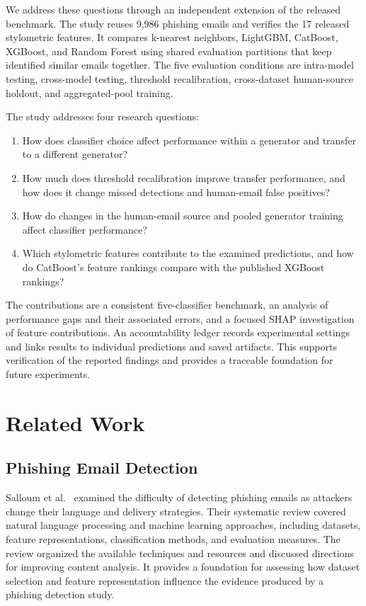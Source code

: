 \documentclass[conference]{IEEEtran}
\begin{document}
We address these questions through an independent extension of the
released benchmark. The study reuses 9,986 phishing emails and
verifies the 17 released stylometric features. It compares
k-nearest neighbors, LightGBM, CatBoost, XGBoost, and Random
Forest using shared evaluation partitions that keep identified
similar emails together. The five evaluation conditions are
intra-model testing, cross-model testing, threshold recalibration,
cross-dataset human-source holdout, and aggregated-pool training.

The study addresses four research questions:
\begin{enumerate}
    \item How does classifier choice affect performance within a
    generator and transfer to a different generator?

    \item How much does threshold recalibration improve transfer
    performance, and how does it change missed detections and
    human-email false positives?

    \item How do changes in the human-email source and pooled
    generator training affect classifier performance?

    \item Which stylometric features contribute to the examined
    predictions, and how do CatBoost's feature rankings compare
    with the published XGBoost rankings?
\end{enumerate}

The contributions are a consistent five-classifier benchmark,
an analysis of performance gaps and their associated errors,
and a focused SHAP investigation of feature contributions.
An accountability ledger records experimental settings and links
results to individual predictions and saved artifacts. This
supports verification of the reported findings and provides a
traceable foundation for future experiments.

\section{Related Work}
\label{sec:related-work}

\subsection{Phishing Email Detection}

Salloum et al.~\cite{salloum2022} examined the difficulty of detecting
phishing emails as attackers change their language and delivery
strategies. Their systematic review covered natural language processing
and machine learning approaches, including datasets, feature
representations, classification methods, and evaluation measures. The
review organized the available techniques and resources and discussed
directions for improving content analysis. It provides a foundation
for assessing how dataset selection and feature representation influence
the evidence produced by a phishing detection study.
\end{document}
